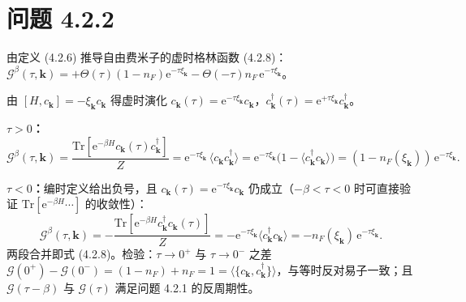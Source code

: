 \section*{问题 4.2.2}
\begin{problem}
由定义 (4.2.6) 推导自由费米子的虚时格林函数 (4.2.8)：$\mathcal{G}^\beta(\tau,\pmb{k})=+\Theta(\tau)(1-n_F)\mathrm{e}^{-\tau\xi_{\pmb{k}}}-\Theta(-\tau)n_F\,\mathrm{e}^{-\tau\xi_{\pmb{k}}}$。
\end{problem}
\solution
由 $[H,c_{\pmb{k}}]=-\xi_{\pmb{k}}c_{\pmb{k}}$ 得虚时演化 $c_{\pmb{k}}(\tau)=\mathrm{e}^{-\tau\xi_{\pmb{k}}}c_{\pmb{k}}$，$c^\dagger_{\pmb{k}}(\tau)=\mathrm{e}^{+\tau\xi_{\pmb{k}}}c^\dagger_{\pmb{k}}$。

\textbf{$\tau>0$：}
\begin{equation*}
\mathcal{G}^\beta(\tau,\pmb{k})=\frac{\mathrm{Tr}[\mathrm{e}^{-\beta H}c_{\pmb{k}}(\tau)c^\dagger_{\pmb{k}}]}{Z}
=\mathrm{e}^{-\tau\xi_{\pmb{k}}}\,\langle c_{\pmb{k}}c^\dagger_{\pmb{k}}\rangle
=\mathrm{e}^{-\tau\xi_{\pmb{k}}}\big(1-\langle c^\dagger_{\pmb{k}}c_{\pmb{k}}\rangle\big)
=(1-n_F(\xi_{\pmb{k}}))\,\mathrm{e}^{-\tau\xi_{\pmb{k}}}.
\end{equation*}

\textbf{$\tau<0$：}编时定义给出负号，且 $c_{\pmb{k}}(\tau)=\mathrm{e}^{-\tau\xi_{\pmb{k}}}c_{\pmb{k}}$ 仍成立（$-\beta<\tau<0$ 时可直接验证 $\mathrm{Tr}[\mathrm{e}^{-\beta H}\cdots]$ 的收敛性）：
\begin{equation*}
\mathcal{G}^\beta(\tau,\pmb{k})=-\frac{\mathrm{Tr}[\mathrm{e}^{-\beta H}c^\dagger_{\pmb{k}}c_{\pmb{k}}(\tau)]}{Z}
=-\mathrm{e}^{-\tau\xi_{\pmb{k}}}\langle c^\dagger_{\pmb{k}}c_{\pmb{k}}\rangle
=-n_F(\xi_{\pmb{k}})\,\mathrm{e}^{-\tau\xi_{\pmb{k}}}.
\end{equation*}
两段合并即式 (4.2.8)。检验：$\tau\to0^{+}$ 与 $\tau\to0^{-}$ 之差 $\mathcal{G}(0^{+})-\mathcal{G}(0^{-})=(1-n_F)+n_F=1=\langle\{c_{\pmb{k}},c^\dagger_{\pmb{k}}\}\rangle$，与等时反对易子一致；且 $\mathcal{G}(\tau-\beta)$ 与 $\mathcal{G}(\tau)$ 满足问题 4.2.1 的反周期性。

